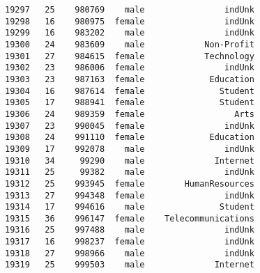 \documentclass[11pt]{article}
\begin{document}
\begin{Verbatim}[commandchars=\\\{\}]
19297   25    980769    male                indUnk   
19298   16    980975  female                indUnk   
19299   16    983202    male                indUnk   
19300   24    983609    male            Non-Profit   
19301   27    984615  female            Technology   
19302   23    986006  female                indUnk   
19303   23    987163  female             Education   
19304   16    987614  female               Student   
19305   17    988941  female               Student   
19306   24    989359  female                  Arts   
19307   23    990045  female                indUnk   
19308   24    991110  female             Education   
19309   17    992078    male                indUnk   
19310   34     99290    male              Internet   
19311   25     99382    male                indUnk   
19312   25    993945  female        HumanResources   
19313   27    994348  female                indUnk   
19314   17    994616    male               Student   
19315   36    996147  female    Telecommunications   
19316   25    997488    male                indUnk   
19317   16    998237  female                indUnk   
19318   27    998966    male                indUnk   
19319   25    999503    male              Internet   


\end{Verbatim}
\end{document}

